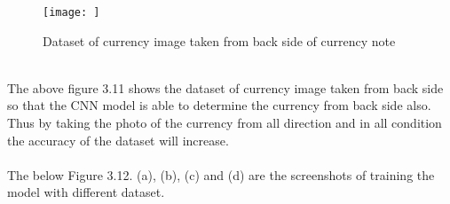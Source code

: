 \begin{figure}[h!]
	\centering
	\texttt{[image: ]}
	\caption{Dataset of currency image taken from back side of currency note}
\end{figure}\\
\noindent The above figure 3.11 shows the dataset of currency image taken from back side so that the CNN model is able to determine the currency from back side also.\\
\noindent Thus by taking the photo of the currency from all direction and in all condition the accuracy of the dataset will increase.\newpage
{}\\\\
The below Figure 3.12. (a), (b), (c) and (d) are the screenshots of training the model with different dataset.
